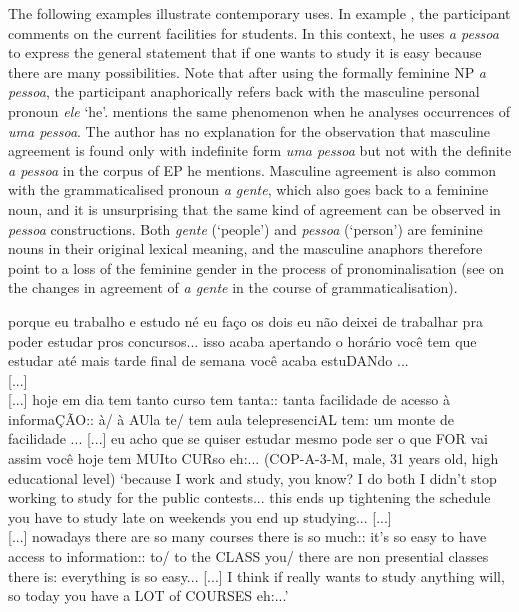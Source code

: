 \documentclass[output=paper]{langscibook}
\begin{document}
The following examples illustrate contemporary uses. In example , the participant comments on the current facilities for students. In this context, he uses {\textit{a pessoa}} {to express the general statement that if one wants to study it is easy because there are many possibilities. Note that after using the formally feminine NP} {\textit{a pessoa}}{, the participant anaphorically refers back with the masculine personal pronoun} {\textit{ele} }{‘he’. \citet[13]{Posio2021} mentions the same phenomenon when he analyses occurrences of} {\textit{uma pessoa}}{. The author has no explanation for the observation that masculine agreement is found only with indefinite form} {\textit{uma pessoa}} {but not with the definite} {\textit{a pessoa}} {in the corpus of EP he mentions. Masculine agreement is also common with the grammaticalised pronoun} {\textit{a gente}}{, which also goes back to a feminine noun, and it is unsurprising that the same kind of agreement can be observed in} {\textit{pessoa} }{constructions. Both} {\textit{gente}} {(‘people’) and} {\textit{pessoa}} {(‘person’) are feminine nouns in their original lexical meaning, and the masculine anaphors therefore point to a loss of the feminine gender in the process of pronominalisation (see \citealt{Lopes2004} on the changes in agreement of} {\textit{a gente}} {in the course of grammaticalisation).}\largerpage[-1]



\eanoraggedright\label{ex:amaral:31}
porque eu trabalho e estudo né eu faço os dois eu não deixei de trabalhar pra poder estudar pros concursos... isso acaba apertando o horário você tem que estudar até mais tarde final de semana você acaba estuDANdo ...\\
{[...]}\\
{[...]} hoje em dia tem tanto curso tem tanta:: tanta facilidade de acesso à informaÇÃO:: à/ à AUla te/ tem aula telepresenciAL tem: um monte de facilidade ... [...] eu acho que se  quiser estudar mesmo pode ser o que FOR  vai assim você hoje tem MUIto CURso eh:... (COP-A-3-M, male, 31 years old, high educational level)\pagebreak
\glt ‘because I work and study, you know? I do both I didn’t stop working to study for the public contests... this ends up tightening the schedule you have to study late on weekends you end up studying... [...]\\
{[...] nowadays there are so many courses there is so much:: it’s so easy to have access to information:: to/ to the CLASS you/ there are non presential classes there is: everything is so easy... [...] I think if  really wants to study anything}  {will, so today you have a LOT of COURSES eh:...’}
\z 
\end{document}
